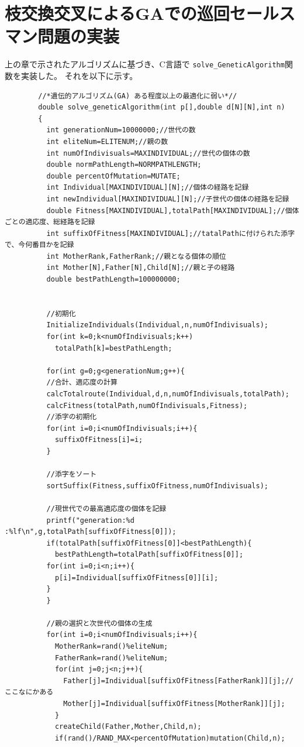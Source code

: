 \documentclass[9pt]{ltjsarticle}
\begin{document}
\newpage
\section{枝交換交叉によるGAでの巡回セールスマン問題の実装}
上の章で示されたアルゴリズムに基づき、C言語で
\verb|solve_GeneticAlgorithm|関数を実装した。
それを以下に示す。

\begin{center}
    \begin{verbatim}
        //*遺伝的アルゴリズム(GA) ある程度以上の最適化に弱い*//
        double solve_geneticAlgorithm(int p[],double d[N][N],int n)
        {
          int generationNum=10000000;//世代の数
          int eliteNum=ELITENUM;//親の数
          int numOfIndivisuals=MAXINDIVIDUAL;//世代の個体の数
          double normPathLength=NORMPATHLENGTH;
          double percentOfMutation=MUTATE;
          int Individual[MAXINDIVIDUAL][N];//個体の経路を記録
          int newIndividual[MAXINDIVIDUAL][N];//子世代の個体の経路を記録
          double Fitness[MAXINDIVIDUAL],totalPath[MAXINDIVIDUAL];//個体ごとの適応度、総経路を記録
          int suffixOfFitness[MAXINDIVIDUAL];//tatalPathに付けられた添字で、今何番目かを記録
          int MotherRank,FatherRank;//親となる個体の順位
          int Mother[N],Father[N],Child[N];//親と子の経路
          double bestPathLength=100000000;
        
        
          //初期化
          InitializeIndividuals(Individual,n,numOfIndivisuals);
          for(int k=0;k<numOfIndivisuals;k++)
            totalPath[k]=bestPathLength;
        
          for(int g=0;g<generationNum;g++){
          //合計、適応度の計算
          calcTotalroute(Individual,d,n,numOfIndivisuals,totalPath);
          calcFitness(totalPath,numOfIndivisuals,Fitness);
          //添字の初期化
          for(int i=0;i<numOfIndivisuals;i++){
            suffixOfFitness[i]=i;
          }
        
          //添字をソート
          sortSuffix(Fitness,suffixOfFitness,numOfIndivisuals);
         
          //現世代での最高適応度の個体を記録  
          printf("generation:%d :%lf\n",g,totalPath[suffixOfFitness[0]]);
          if(totalPath[suffixOfFitness[0]]<bestPathLength){
            bestPathLength=totalPath[suffixOfFitness[0]];
          for(int i=0;i<n;i++){
            p[i]=Individual[suffixOfFitness[0]][i];
          }
          }
        
          //親の選択と次世代の個体の生成
          for(int i=0;i<numOfIndivisuals;i++){
            MotherRank=rand()%eliteNum;
            FatherRank=rand()%eliteNum;
            for(int j=0;j<n;j++){
              Father[j]=Individual[suffixOfFitness[FatherRank]][j];//ここなにかある
              Mother[j]=Individual[suffixOfFitness[MotherRank]][j];
            }
            createChild(Father,Mother,Child,n);
            if(rand()/RAND_MAX<percentOfMutation)mutation(Child,n);
        

\end{verbatim}
\end{center}
\end{document}
